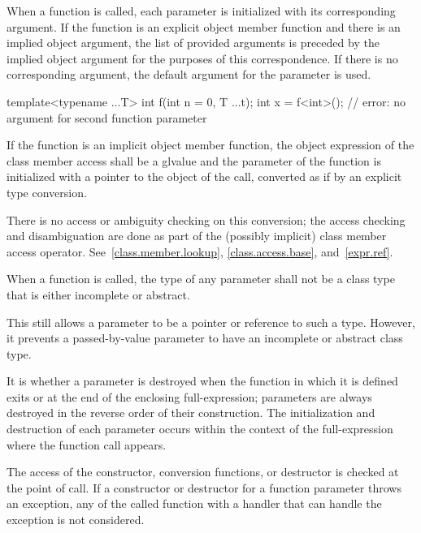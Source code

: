 \pnum
{}%
%
%
When a function is called, each parameter is
initialized with
its corresponding argument.
If the function is an explicit object member function and
there is an implied object argument,
the list of provided arguments is preceded by the implied object argument
for the purposes of this correspondence.
If there is no corresponding argument,
the default argument for the parameter is used.
\begin{example}
\begin{codeblock}
template<typename ...T> int f(int n = 0, T ...t);
int x = f<int>();               // error: no argument for second function parameter
\end{codeblock}
\end{example}
If the function is an implicit object member
function,
the object expression of the class member access shall be a glvalue and
the  parameter of the function
is initialized with a pointer to the object of the call, converted
as if by an explicit type conversion.
\begin{note}
There is no access or ambiguity checking on this conversion; the access
checking and disambiguation are done as part of the (possibly implicit)
class member access operator.
See~\ref{class.member.lookup}, \ref{class.access.base},
and~\ref{expr.ref}.
\end{note}
When a function is called, the type of any parameter
shall not be a class type that is either incomplete or abstract.
\begin{note}
This still allows a parameter to be a pointer or reference to such
a type. However, it prevents a passed-by-value parameter
to have an incomplete or abstract class type.
\end{note}
It is 
whether a parameter is destroyed
when the function in which it is defined exits
or at the end of the enclosing full-expression;
parameters are always destroyed in the reverse order of their construction.
The initialization and destruction of each parameter occurs
within the context of the full-expression
where the function call appears.
\begin{example}
The access of the
constructor, conversion functions, or destructor is
checked at the point of call. If a constructor
or destructor for a function parameter throws an exception,
any 
of the called function
with a handler that can handle the exception
is not considered.
\end{example}

